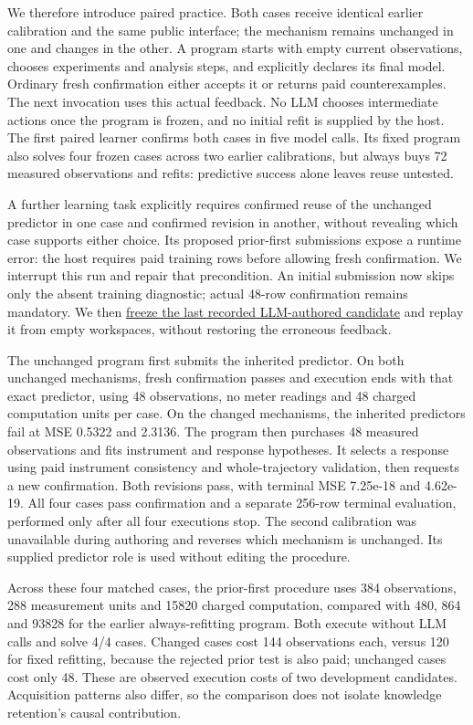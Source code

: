\documentclass[twoside,11pt]{article}
\begin{document}
We therefore introduce paired practice. Both cases receive identical earlier
calibration and the same public interface; the mechanism remains unchanged in
one and changes in the other. A program starts with empty current observations,
chooses experiments and analysis steps, and explicitly declares its final model.
Ordinary fresh confirmation either accepts it or returns paid counterexamples.
The next invocation uses this actual feedback. No LLM chooses intermediate actions
once the program is frozen, and no initial refit is supplied by the host. The
first paired learner confirms both cases in five model calls. Its fixed program
also solves four frozen cases across two earlier calibrations, but always buys
72 measured observations and refits: predictive success alone leaves reuse untested.


A further learning task explicitly requires confirmed reuse of the unchanged
predictor in one case and confirmed revision in another, without revealing which
case supports either choice. Its proposed prior-first submissions expose a runtime
error: the host requires paid training rows before allowing fresh confirmation.
We interrupt this run and repair that precondition. An initial submission now
skips only the absent training diagnostic; actual 48-row confirmation remains
mandatory. We then \hyperlink{artifact-63}{freeze the last recorded LLM-authored candidate}
and replay it from empty workspaces, without restoring the erroneous feedback.


The unchanged program first submits the inherited predictor. On both unchanged
mechanisms, fresh confirmation passes and execution ends with that exact predictor,
using 48 observations, no meter readings and 48 charged computation units per case.
On the changed mechanisms, the inherited predictors fail at MSE 0.5322 and 2.3136.
The program then purchases 48 measured observations and fits instrument and response
hypotheses. It selects a response using paid instrument consistency and whole-trajectory
validation, then requests a new confirmation. Both revisions pass, with terminal
MSE 7.25e-18 and 4.62e-19. All four cases pass confirmation and a separate 256-row
terminal evaluation, performed only after all four executions stop. The second
calibration was unavailable during authoring and reverses which mechanism is
unchanged. Its supplied predictor role is used without editing the procedure.


Across these four matched cases, the prior-first procedure uses 384 observations,
288 measurement units and 15820 charged computation, compared with 480, 864 and
93828 for the earlier always-refitting program. Both execute without LLM calls and
solve 4/4 cases. Changed cases cost 144 observations each, versus 120 for fixed
refitting, because the rejected prior test is also paid; unchanged cases cost only
48. These are observed execution costs of two development candidates. Acquisition
patterns also differ, so the comparison does not isolate knowledge retention's
causal contribution.
\end{document}
